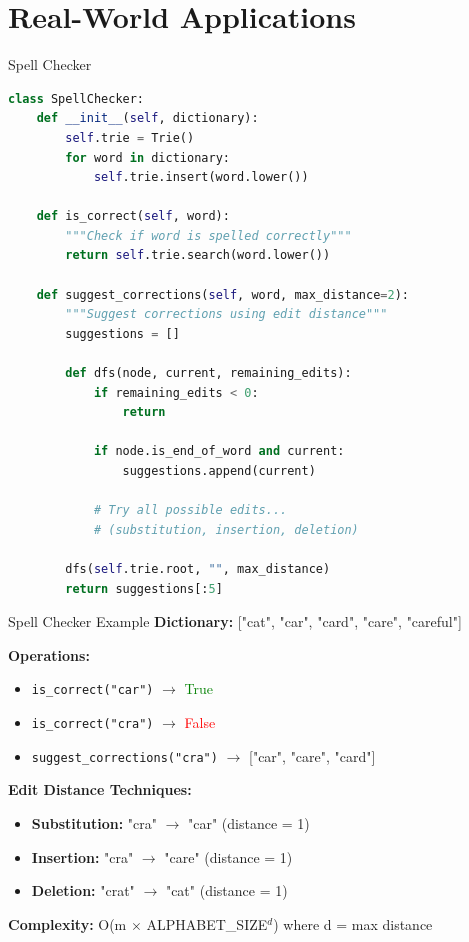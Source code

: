 \documentclass[aspectratio=169]{beamer}
\begin{document}
\section{Real-World Applications}

\begin{frame}[fragile]{Spell Checker}
  \begin{lstlisting}[language=Python, basicstyle=\ttfamily\footnotesize]
class SpellChecker:
    def __init__(self, dictionary):
        self.trie = Trie()
        for word in dictionary:
            self.trie.insert(word.lower())

    def is_correct(self, word):
        """Check if word is spelled correctly"""
        return self.trie.search(word.lower())

    def suggest_corrections(self, word, max_distance=2):
        """Suggest corrections using edit distance"""
        suggestions = []

        def dfs(node, current, remaining_edits):
            if remaining_edits < 0:
                return

            if node.is_end_of_word and current:
                suggestions.append(current)

            # Try all possible edits...
            # (substitution, insertion, deletion)

        dfs(self.trie.root, "", max_distance)
        return suggestions[:5]
  \end{lstlisting}
\end{frame}

\begin{frame}{Spell Checker Example}
  \textbf{Dictionary:} ["cat", "car", "card", "care", "careful"]

  \vspace{0.3cm}
  \textbf{Operations:}
  \begin{itemize}
    \item \texttt{is\_correct("car")} $\rightarrow$ \textcolor{green}{True}
    \item \texttt{is\_correct("cra")} $\rightarrow$ \textcolor{red}{False}
    \item \texttt{suggest\_corrections("cra")} $\rightarrow$ ["car", "care", "card"]
  \end{itemize}

  \vspace{0.3cm}
  \textbf{Edit Distance Techniques:}
  \begin{itemize}
    \item \textbf{Substitution:} "cra" $\rightarrow$ "car" (distance = 1)
    \item \textbf{Insertion:} "cra" $\rightarrow$ "care" (distance = 1)
    \item \textbf{Deletion:} "crat" $\rightarrow$ "cat" (distance = 1)
  \end{itemize}

  \vspace{0.3cm}
  \textbf{Complexity:} O(m $\times$ ALPHABET\_SIZE$^d$) where d = max distance
\end{frame}
\end{document}
